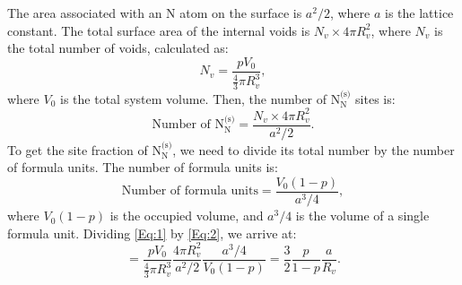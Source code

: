 \documentclass[preprint,12pt,sort&compress]{elsarticle}
\newcommand{\?}{\stackrel{?}{=}}
\begin{document}
The area associated with an N atom on the surface is $a^2/2$, where $a$ is the lattice constant. The total surface area of the internal voids is $N_v \times 4 \pi R_v^2$, where $N_v$ is the total number of voids, calculated as:
\begin{equation}
N_v = \frac{ p V_0 }{ \frac{4}{3} \pi R_v^3 },
\end{equation}
where $V_0$ is the total system volume. Then, the number of $\text{N}_\text{N}^\text{(s)}$ sites is:
\begin{equation}
\text{Number of } \text{N}_\text{N}^\text{(s)} = \frac{ N_v \times 4 \pi R_v^2 } { a^2 / 2 }. 
\label{Eq:1}
\end{equation}
To get the site fraction of $\text{N}_\text{N}^\text{(s)}$, we need to divide its total number by the number of formula units. The number of formula units is:
\begin{equation}
\text{Number of formula units} = \frac{V_0 (1 - p)}{ a^3 / 4 }, 
\label{Eq:2}
\end{equation}
where $V_0 (1 - p)$ is the occupied volume, and $a^3 / 4$ is the volume of a single formula unit. Dividing \cref{Eq:1} by \cref{Eq:2}, we arrive at:
\begin{equation}
[ \text{N}_\text{N}^\text{(s)} ] = \frac{p V_0}{ \frac{4}{3} \pi R_v^3 } \frac{4 \pi R_v^2}{a^2/2}  \frac{ a^3/4 }{ V_0 (1 - p) } = \frac{3}{2} \frac{p}{1-p} \frac{a}{R_v}.
\label{Eq:NNs}
\end{equation}
\end{document}
